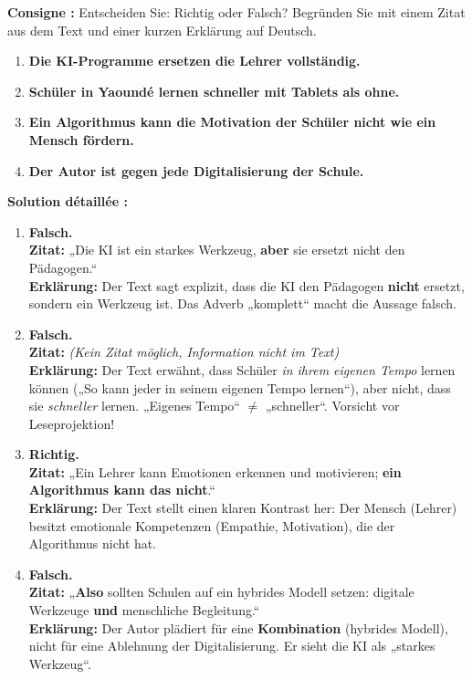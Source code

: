 \documentclass[11pt]{article}
\begin{document}
\begin{exoresolu}
\textbf{Consigne :} Entscheiden Sie: Richtig oder Falsch? Begründen Sie mit einem Zitat aus dem Text und einer kurzen Erklärung auf Deutsch.

\begin{enumerate}
    \item \textbf{Die KI-Programme ersetzen die Lehrer vollständig.}
    \item \textbf{Schüler in Yaoundé lernen schneller mit Tablets als ohne.}
    \item \textbf{Ein Algorithmus kann die Motivation der Schüler nicht wie ein Mensch fördern.}
    \item \textbf{Der Autor ist gegen jede Digitalisierung der Schule.}
\end{enumerate}

\tcblower

\textbf{Solution détaillée :}

\begin{enumerate}
    \item \textbf{Falsch.} \\
    \textbf{Zitat:} „Die KI ist ein starkes Werkzeug, \textbf{aber} sie ersetzt nicht den Pädagogen.“ \\
    \textbf{Erklärung:} Der Text sagt explizit, dass die KI den Pädagogen \textbf{nicht} ersetzt, sondern ein Werkzeug ist. Das Adverb „komplett“ macht die Aussage falsch.

    \item \textbf{Falsch.} \\
    \textbf{Zitat:} \emph{(Kein Zitat möglich, Information nicht im Text)} \\
    \textbf{Erklärung:} Der Text erwähnt, dass Schüler \emph{in ihrem eigenen Tempo} lernen können („So kann jeder in seinem eigenen Tempo lernen“), aber nicht, dass sie \emph{schneller} lernen. „Eigenes Tempo“ $\neq$ „schneller“. Vorsicht vor Leseprojektion!

    \item \textbf{Richtig.} \\
    \textbf{Zitat:} „Ein Lehrer kann Emotionen erkennen und motivieren; \textbf{ein Algorithmus kann das nicht}.“ \\
    \textbf{Erklärung:} Der Text stellt einen klaren Kontrast her: Der Mensch (Lehrer) besitzt emotionale Kompetenzen (Empathie, Motivation), die der Algorithmus nicht hat.

    \item \textbf{Falsch.} \\
    \textbf{Zitat:} „\textbf{Also} sollten Schulen auf ein hybrides Modell setzen: digitale Werkzeuge \textbf{und} menschliche Begleitung.“ \\
    \textbf{Erklärung:} Der Autor plädiert für eine \textbf{Kombination} (hybrides Modell), nicht für eine Ablehnung der Digitalisierung. Er sieht die KI als „starkes Werkzeug“.
\end{enumerate}
\end{exoresolu}
\end{document}
